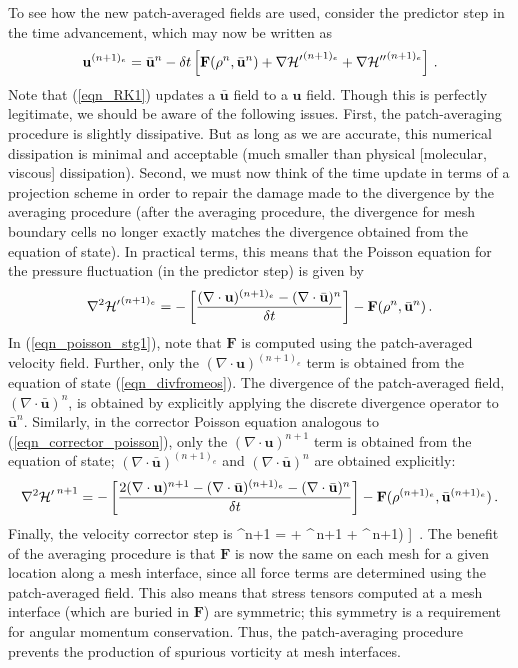 \documentclass[11pt]{book}
\begin{document}
To see how the new patch-averaged fields are used, consider the predictor step in the time advancement, which may now be written as
\begin{equation}
\label{eqn_RK1}
\mathbf{u}^{(n+1)_e} = \bar{\mathbf{u}}^n - \delta t \left[ \mathbf{F}(\rho^n,\bar{\mathbf{u}}^n) + {\nabla{\cal H}'}^{(n+1)_e} + {\nabla{\cal H}''}^{(n+1)_e} \right] \,\mbox{.}
\end{equation}
Note that (\ref{eqn_RK1}) updates a $\bar{\mathbf{u}}$ field to a $\mathbf{u}$ field.  Though this is perfectly legitimate, we should be aware of the following issues.  First, the patch-averaging procedure is slightly dissipative.  But as long as we are accurate, this numerical dissipation is minimal and acceptable (much smaller than physical [molecular, viscous] dissipation).  Second, we must now think of the time update in terms of a projection scheme in order to repair the damage made to the divergence by the averaging procedure (after the averaging procedure, the divergence for mesh boundary cells no longer exactly matches the divergence obtained from the equation of state). In practical terms, this means that the Poisson equation for the pressure fluctuation (in the predictor step) is given by
\begin{equation}
\label{eqn_poisson_stg1}
\nabla^2 {{\cal H}'}^{(n+1)_e} = -\left[\frac{ (\nabla\cdot\mathbf{u})^{(n+1)_e} - (\nabla\cdot\bar{\mathbf{u}})^n}{\delta t}\right] -  \mathbf{F}(\rho^n,\bar{\mathbf{u}}^n) \,\mbox{.}
\end{equation}
In (\ref{eqn_poisson_stg1}), note that $\mathbf{F}$ is computed using the patch-averaged velocity field. Further, only the $(\nabla\cdot\mathbf{u})^{(n+1)_e}$ term is obtained from the equation of state (\ref{eqn_divfromeos}).  The divergence of the patch-averaged field, $(\nabla\cdot\bar{\mathbf{u}})^n$, is obtained by explicitly applying the discrete divergence operator to $\bar{\mathbf{u}}^n$.  Similarly, in the corrector Poisson equation analogous to (\ref{eqn_corrector_poisson}), only the $(\nabla\cdot\mathbf{u})^{n+1}$ term is obtained from the equation of state; $(\nabla\cdot\bar{\mathbf{u}})^{(n+1)_e}$ and $(\nabla\cdot\bar{\mathbf{u}})^n$ are obtained explicitly:
\begin{equation}
\label{eqn_poisson_stg2}
\nabla^2 {{\cal H}'}^{\,n+1} = -\left[\frac{ 2(\nabla\cdot\mathbf{u})^{n+1} - (\nabla\cdot\bar{\mathbf{u}})^{(n+1)_e} - (\nabla\cdot\bar{\mathbf{u}})^n}{\delta t}\right] -  \mathbf{F}(\rho^{(n+1)_e},\bar{\mathbf{u}}^{(n+1)_e}) \,\mbox{.}
\end{equation}
Finally, the velocity corrector step is
\be
\label{eqn_RK2}
\bu^{n+1} = \ha \left[ \bar{\bu}^n + \bar{\bu}^{(n+1)_e} - \dt \left( \mathbf{F}[\rho^{(n+1)_e},\bar{\mathbf{u}}^{(n+1)_e}] + ^{\,n+1} + ^{\,n+1}\right) \right] \,\mbox{.}
\ee
The benefit of the averaging procedure is that $\mathbf{F}$ is now the same on each mesh for a given location along a mesh interface, since all force terms are determined using the patch-averaged field.  This also means that stress tensors computed at a mesh interface (which are buried in $\mathbf{F}$) are symmetric; this symmetry is a requirement for angular momentum conservation.  Thus, the patch-averaging procedure prevents the production of spurious vorticity at mesh interfaces.
\end{document}
